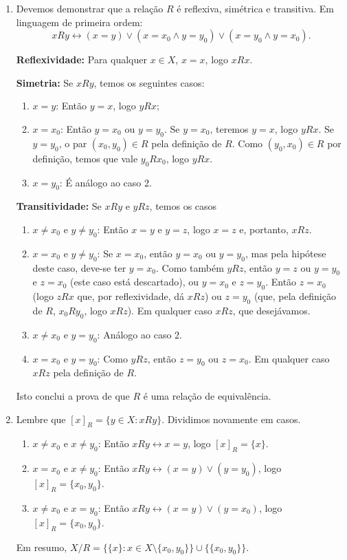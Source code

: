 \begin{solucao}
	\begin{enumerate}[label=(\alph{*})]
		\item Devemos demonstrar que a relação $R$ é reflexiva, simétrica e transitiva. Em linguagem de primeira ordem:
		$$xRy\leftrightarrow(x=y)\vee(x=x_0\wedge y=y_0)\vee(x=y_0\wedge y=x_0).$$
		
		\textbf{Reflexividade:} Para qualquer $x\in X$, $x=x$, logo $xRx$.
		
		\textbf{Simetria:} Se $xRy$, temos os seguintes casos:
		\begin{enumerate}[label=Caso \arabic{*}.]
			\item $x=y$: Então $y=x$, logo $yRx$;
			\item $x=x_0$: Então $y=x_0$ ou $y=y_0$. Se $y=x_0$, teremos $y=x$, logo $yRx$. Se $y=y_0$, o par $(x_0,y_0)\in R$ pela definição de $R$. Como $(y_0,x_0)\in R$ por definição, temos que vale $y_0Rx_0$, logo $yRx$.
			\item $x=y_0$: É análogo ao caso 2.
		\end{enumerate}
		
		\textbf{Transitividade:} Se $xRy$ e $yRz$, temos os casos
		\begin{enumerate}[label=Caso \arabic{*}.]
			\item $x\neq x_0$ e $y\neq y_0$: Então $x=y$ e $y=z$, logo $x=z$ e, portanto, $xRz$.
			\item $x=x_0$ e $y\neq y_0$: Se $x=x_0$, então $y=x_0$ ou $y=y_0$, mas pela hipótese deste caso, deve-se ter $y=x_0$. Como também $yRz$, então $y=z$ ou $y=y_0$ e $z=x_0$ (este caso está descartado), ou $y=x_0$ e $z=y_0$. Então $z=x_0$ (logo $zRx$ que, por reflexividade, dá $xRz$) ou $z=y_0$ (que, pela definição de $R$, $x_0Ry_0$, logo $xRz$). Em qualquer caso $xRz$, que desejávamos.
			\item $x\neq x_0$ e $y=y_0$: Análogo ao caso 2.
			\item $x=x_0$ e $y=y_0$: Como $yRz$, então $z=y_0$ ou $z=x_0$. Em qualquer caso $xRz$ pela definição de $R$.
		\end{enumerate}
		
		Isto conclui a prova de que $R$ é uma relação de equivalência.
		
		\item Lembre que $[x]_R=\{y\in X:xRy\}$. Dividimos novamente em casos.
		\begin{enumerate}[label=Caso \arabic{*}.]
			\item $x\neq x_0$ e $x\neq y_0$: Então $xRy\leftrightarrow x=y$, logo $[x]_R=\{x\}$.
			\item $x= x_0$ e $x\neq y_0$: Então $xRy\leftrightarrow (x=y)\vee (y=y_0)$, logo $[x]_R=\{x_0,y_0\}$.
			\item $x\neq x_0$ e $x= y_0$: Então $xRy\leftrightarrow (x=y)\vee (y=x_0)$, logo $[x]_R=\{x_0,y_0\}$.
		\end{enumerate}
		
		Em resumo, $X/R=\{\{x\}:x\in X\setminus\{x_0,y_0\}\}\cup\{\{x_0,y_0\}\}.$
	\end{enumerate}
\end{solucao}

